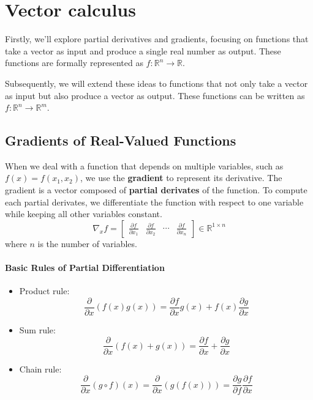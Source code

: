 \documentclass{article}
\begin{document}
\section{Vector calculus}
Firstly, we'll explore partial derivatives and gradients, focusing on functions that take a vector as input and produce a
single real number as output. These functions are formally represented as
$f:\mathbb{R}^n\to \mathbb{R}$.

Subsequently, we will extend these ideas to functions that not only take a
vector as input but also produce a vector as output. These functions can be
written as $f:\mathbb{R}^n\to \mathbb{R}^m$.

\subsection{Gradients of Real-Valued Functions}
When we deal with a function that depends on multiple variables, such as 
$f(x)=f(x_1,x_2)$, we use the \textbf{gradient} to represent its derivative.
The gradient is a vector composed of \textbf{partial derivates} of the
function. To compute each partial derivates, we differentiate the function
with respect to one variable while keeping all other variables constant.
\begin{equation}\label{eq:gradient_real_valued_functions}
   \nabla_x f=\begin{bmatrix}
       \frac{\partial{f}}{\partial{x_1}} &
       \frac{\partial{f}}{\partial{x_2}} & \cdots &
       \frac{\partial{f}}{\partial{x_n}}
    \end{bmatrix}\in \mathbb{R}^{1\times n} 
\end{equation}
where $n$ is the number of variables.
\paragraph{Basic Rules of Partial Differentiation}
\begin{itemize}
    \item[] Product rule:
        $$\frac{\partial}{\partial{x}}(f(x)g(x))=\frac{\partial{f}}{\partial{x}}g(x)+f(x)\frac{\partial{g}}{\partial{x}}$$
    \item[] Sum rule:
        $$\frac{\partial}{\partial{x}}(f(x)+g(x))=\frac{\partial{f}}{\partial{x}}+\frac{\partial{g}}{\partial{x}}$$
    \item [] Chain rule:
        $$\frac{\partial}{\partial{x}}(g\circ
        f)(x)=\frac{\partial}{\partial{x}}\left(g(f(x))\right)=\frac{\partial{g}}{\partial{f}}\frac{\partial{f}}{\partial{x}}$$
\end{itemize}
\end{document}
